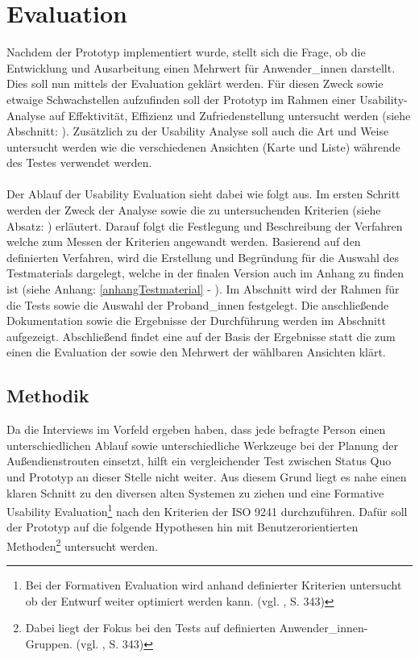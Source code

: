 \documentclass[Bachelorarbeit.tex]{subfiles}
\begin{document}
\chapter{Evaluation}
\label{chap:evalutation}
Nachdem der Prototyp implementiert wurde, stellt sich die Frage, ob die Entwicklung und Ausarbeitung einen Mehrwert für Anwender\_innen darstellt. 
Dies soll nun mittels der Evaluation geklärt werden.
Für diesen Zweck sowie etwaige Schwachstellen aufzufinden soll der Prototyp im Rahmen einer Usability-Analyse auf Effektivität, Effizienz und Zufriedenstellung \cite[vgl.][Abs.: 3]{Iso9241_11} untersucht werden (siehe Abschnitt: ).
Zusätzlich zu der Usability Analyse soll auch die Art und Weise untersucht werden wie die verschiedenen Ansichten (Karte und Liste) währende des Testes verwendet werden.\\
\\
Der Ablauf der Usability Evaluation sieht dabei wie folgt aus.
Im ersten Schritt werden der Zweck der Analyse sowie die zu untersuchenden Kriterien (siehe Absatz: ) erläutert.
Darauf folgt die Festlegung und Beschreibung der Verfahren welche zum Messen der Kriterien angewandt werden.
Basierend auf den definierten Verfahren, wird die Erstellung und Begründung für die Auswahl des Testmaterials dargelegt, welche in der finalen Version auch im Anhang zu finden ist (siehe Anhang: \ref{anhangTestmaterial} - ).
Im Abschnitt  wird der Rahmen für die Tests sowie die Auswahl der Proband\_innen festgelegt.
Die anschließende Dokumentation sowie die Ergebnisse der Durchführung werden im Abschnitt  aufgezeigt.
Abschließend findet eine  auf der Basis der Ergebnisse statt die zum einen die Evaluation der  sowie den Mehrwert der wählbaren Ansichten  klärt.

\section{Methodik}
\label{Methodik}

Da die Interviews im Vorfeld ergeben haben, dass jede befragte Person einen unterschiedlichen Ablauf sowie unterschiedliche Werkzeuge bei der Planung der Außendienstrouten einsetzt, hilft ein vergleichender Test zwischen Status Quo und Prototyp an dieser Stelle nicht weiter.
Aus diesem Grund liegt es nahe einen klaren Schnitt zu den diversen alten Systemen zu ziehen und eine Formative Usability Evaluation\footnote{Bei der Formativen Evaluation wird anhand definierter Kriterien untersucht ob der Entwurf weiter optimiert werden kann. (vgl. \cite{Burmester}, S. 343)} nach den Kriterien der ISO 9241 durchzuführen.
Dafür soll der Prototyp auf die folgende Hypothesen hin mit Benutzerorientierten Methoden\footnote{Dabei liegt der Fokus bei den Tests auf definierten Anwender\_innen-Gruppen. (vgl. \cite{Burmester}, S. 343)} untersucht werden.
\end{document}
